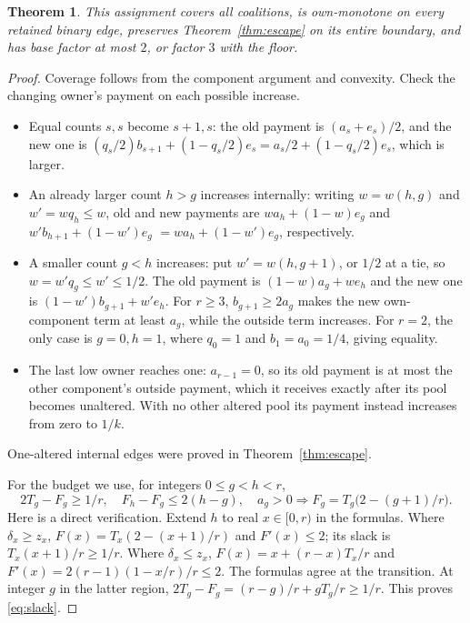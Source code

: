 \documentclass[11pt]{article}
\newtheorem{theorem}{Theorem}[section]
\theoremstyle{definition}\newtheorem{definition}[theorem]{Definition}
\theoremstyle{remark}\newtheorem{remark}[theorem]{Remark}
\begin{document}
\begin{theorem}\label{thm:binary-two}
This assignment covers all coalitions, is own-monotone on every retained
binary edge, preserves Theorem~\ref{thm:escape} on its entire boundary,
and has base factor at most $2$, or factor $3$ with the floor.
\end{theorem}
\begin{proof}
Coverage follows from the component argument and convexity. Check the changing
owner's payment on each possible increase.
\begin{itemize}
\item Equal counts $s,s$ become $s+1,s$: the old payment is
$(a_s+e_s)/2$, and the new one is
$(q_s/2)b_{s+1}+(1-q_s/2)e_s=a_s/2+(1-q_s/2)e_s$, which is larger.
\item An already larger count $h>g$ increases internally: writing
$w=w(h,g)$ and $w'=wq_h\le w$, old and new payments are
$wa_h+(1-w)e_g$ and $w'b_{h+1}+(1-w')e_g$
$=wa_h+(1-w')e_g$, respectively.
\item A smaller count $g<h$ increases: put $w'=w(h,g+1)$, or $1/2$ at a
tie, so $w=w'q_g\le w'\le1/2$. The old payment is
$(1-w)a_g+we_h$ and the new one is $(1-w')b_{g+1}+w'e_h$.
For $r\ge3$, $b_{g+1}\ge2a_g$ makes the new own-component term at least
$a_g$, while the outside term increases. For $r=2$, the only case is
$g=0,h=1$, where $q_0=1$ and $b_1=a_0=1/4$, giving equality.
\item The last low owner reaches one: $a_{r-1}=0$, so its old payment is
at most the other component's outside payment, which it receives exactly
after its pool becomes unaltered. With no other altered pool its payment
instead increases from zero to $1/k$.
\end{itemize}
One-altered internal edges were proved in Theorem~\ref{thm:escape}.

For the budget we use, for integers $0\le g<h<r$,
\begin{equation}\label{eq:slack}
 2T_g-F_g\ge1/r,\quad F_h-F_g\le2(h-g),\quad
 a_g>0\Longrightarrow F_g=T_g\bigl(2-(g+1)/r\bigr).
\end{equation}
Here is a direct verification. Extend $h$ to real $x\in[0,r)$ in the formulas.
Where $\delta_x\ge z_x$, $F(x)=T_x(2-(x+1)/r)$ and $F'(x)\le2$;
its slack is $T_x(x+1)/r\ge1/r$. Where $\delta_x\le z_x$,
$F(x)=x+(r-x)T_x/r$ and
$F'(x)=2(r-1)(1-x/r)/r\le2$. The formulas agree at the transition.
At integer $g$ in the latter region,
$2T_g-F_g=(r-g)/r+gT_g/r\ge1/r$. This proves \eqref{eq:slack}.


\end{proof}
\end{document}
